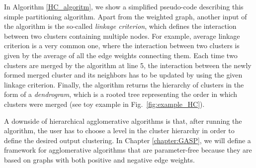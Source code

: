 In Algorithm \ref{HC_algoritm}, we show a simplified pseudo-code describing this simple partitioning algorithm. Apart from the weighted graph, another input of the algorithm is the so-called \emph{linkage criterion}, which defines the interaction between two clusters containing multiple nodes. For example, average linkage criterion is a very common one, where the interaction between two clusters is given by the average of all the edge weights connecting them. Each time two clusters are merged by the algorithm at line 5, the interaction between the newly formed merged cluster and its neighbors has to be updated by using the given linkage criterion. 
Finally, the algorithm returns the hierarchy of clusters in the form of a \emph{dendrogram}, which is a rooted tree representing the order in which clusters were merged (see toy example in Fig.~\ref{fig:example_HC}). 

A downside of hierarchical agglomerative algorithms is that, after running the algorithm, the user has to choose a level in the cluster hierarchy in order to define the desired output clustering. 
In Chapter \ref{chapter:GASP}, we will define a framework for agglomerative algorithms that are parameter-free because they are based on graphs with both positive and negative edge weights.


